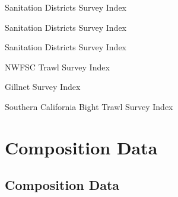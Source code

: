 \documentclass[ignorenonframetext,compress]{beamer}
\begin{document}
\begin{frame}{Sanitation Districts Survey Index}

\begin{table}[ht]
\centering
{}
\end{table}

\end{frame}

\begin{frame}{Sanitation Districts Survey Index}

\end{frame}

\begin{frame}{Sanitation Districts Survey Index}

\end{frame}

\begin{frame}{NWFSC Trawl Survey Index}

\end{frame}

\begin{frame}{Gillnet Survey Index}

\end{frame}

\begin{frame}{Southern California Bight Trawl Survey Index}

\end{frame}

\section{Composition Data}\label{composition-data}

\subsection{Composition Data}\label{composition-data-1}
\end{document}
